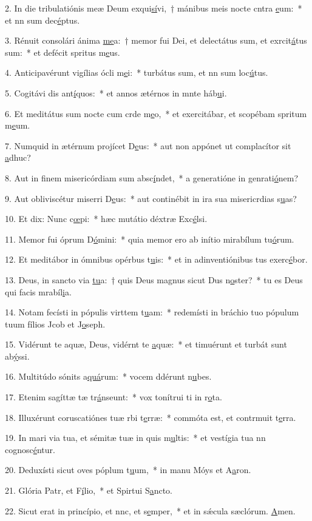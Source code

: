 2. In die tribulatiónis meæ Deum exqui\uline{sí}vi,~† mánibus meis nocte cntra \uline{e}um:~* et nn sum dec\uline{é}ptus.\par 
3. Rénuit consolári ánima \uline{me}a:~† memor fui Dei, et delectátus sum, et exrcit\uline{á}tus sum:~* et defécit spritus m\uline{e}us.\par 
4. Anticipavérunt vigílias ócli m\uline{e}i:~* turbátus sum, et nn sum loc\uline{ú}tus.\par 
5. Cogitávi dis ant\uline{í}quos:~* et annos ætérnos in mnte háb\uline{u}i.\par 
6. Et meditátus sum nocte cum crde m\uline{e}o,~* et exercitábar, et scopébam spritum m\uline{e}um.\par 
7. Numquid in ætérnum projícet D\uline{e}us:~* aut non appónet ut complacítor sit \uline{a}dhuc?\par 
8. Aut in finem misericórdiam sum absc\uline{í}ndet,~* a generatióne in genrati\uline{ó}nem?\par 
9. Aut obliviscétur miserri D\uline{e}us:~* aut continébit in ira sua misericrdias s\uline{u}as?\par 
10. Et dix: Nunc c\uline{œ}pi:~* hæc mutátio déxtræ Exc\uline{é}lsi.\par 
11. Memor fui óprum D\uline{ó}mini:~* quia memor ero ab inítio mirabílum tu\uline{ó}rum.\par 
12. Et meditábor in ómnibus opérbus t\uline{u}is:~* et in adinventiónibus tus exerc\uline{é}bor.\par 
13. Deus, in sancto via \uline{tu}a:~† quis Deus magnus sicut Dus n\uline{o}ster?~* tu es Deus qui facis mrabíl\uline{i}a.\par 
14. Notam fecísti in pópulis virttem t\uline{u}am:~* redemísti in bráchio tuo pópulum tuum fílios Jcob et J\uline{o}seph.\par 
15. Vidérunt te aquæ, Deus, vidérnt te \uline{a}quæ:~* et timuérunt et turbát sunt ab\uline{ý}ssi.\par 
16. Multitúdo sónits a\uline{quá}rum:~* vocem ddérunt n\uline{u}bes.\par 
17. Etenim sagíttæ tæ tr\uline{á}nseunt:~* vox tonítrui ti in r\uline{o}ta.\par 
18. Illuxérunt coruscatiónes tuæ rbi t\uline{e}rræ:~* commóta est, et contrmuit t\uline{e}rra.\par 
19. In mari via tua, et sémitæ tuæ in quis m\uline{u}ltis:~* et vestígia tua nn cognosc\uline{é}ntur.\par 
20. Deduxísti sicut oves póplum t\uline{u}um,~* in manu Móys et A\uline{a}ron.\par 
21. Glória Patr, et F\uline{í}lio,~* et Spirtui S\uline{a}ncto.\par 
22. Sicut erat in princípio, et nnc, et s\uline{e}mper,~* et in sǽcula sæclórum. \uline{A}men.\par 
